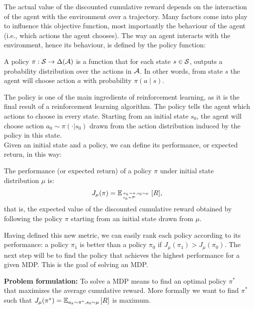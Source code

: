 The actual value of the discounted cumulative reward depends on the interaction of the agent with the environment over a trajectory. Many factors come into play to influence this objective function, most importantly the behaviour of the agent (i.e., which actions the agent chooses). The way an agent interacts with the environment, hence its behaviour, is defined by the policy function:
\begin{definition}
A policy $\pi: \sspace \rightarrow \Delta (\aspace)$ is a function that for each state $s \in \sspace$, outputs a probability distribution over the actions in $\aspace$. In other words, from state $s$ the agent will choose action $a$ with probability $\pi(a \mid s)$.
\end{definition}

The policy is one of the main ingredients of reinforcement learning, as it is the final result of a reinforcement learning algorithm. The policy tells the agent which actions to choose in every state.
Starting from an initial state $s_0$, the agent will choose action $a_0 \sim \pi(\cdot | s_0)$ drawn from the action distribution induced by the policy in this state. \\
Given an initial state and a policy, we can define its performance, or expected return, in this way:
\begin{definition}
The performance (or expected return) of a policy $\pi$ under initial state distribution $\mu$ is:
\[
J_\mu(\pi) = \EV[{\genfrac{}{}{0pt}{}{a_k \sim \pi, s_0 \sim \mu}{s_k \sim \tfunc \hspace{20pt}}}]{R},
\]
that is, the expected value of the discounted cumulative reward obtained by following the policy $\pi$ starting from an initial state drawn from $\mu$.
\end{definition}
Having defined this new metric, we can easily rank each policy according to its performance: a policy $\pi_1$ is better than a policy $\pi_0$ if $J_\mu(\pi_1) > J_\mu(\pi_0)$. The next step will be to find the policy that achieves the highest performance for a given MDP. This is the goal of solving an MDP.

\textbf{Problem formulation:}\quad
To solve a MDP means to find an optimal policy $\pi^*$ that maximizes the average cumulative reward. More formally we want to find $\pi^*$ such that $J_\mu(\pi^*)=\EV[a_k \sim \pi^*, s_0 \sim \mu]{R}$ is maximum.

